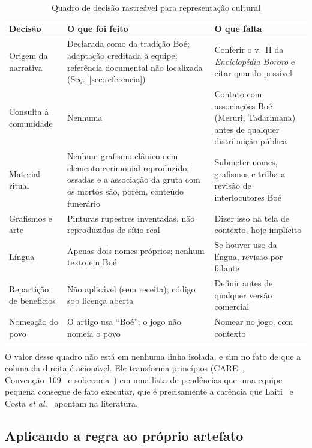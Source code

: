\documentclass[conference]{IEEEtran}
\begin{document}
\begin{table}[t]
\caption{Quadro de decisão rastreável para representação cultural}
\label{tab:protocolo}
\centering
\footnotesize
\begin{tabular}{p{1.9cm}p{2.6cm}p{2.8cm}}
\toprule
\textbf{Decisão} & \textbf{O que foi feito} & \textbf{O que falta} \\
\midrule
Origem da narrativa
& Declarada como da tradição Boé; adaptação creditada à equipe; referência documental não localizada (Seç.~\ref{sec:referencia})
& Conferir o v.~II da \textit{Enciclopédia Bororo} e citar quando possível \\[3pt]
Consulta à comunidade
& Nenhuma
& Contato com associações Boé (Meruri, Tadarimana) antes de qualquer distribuição pública \\[3pt]
Material ritual
& Nenhum grafismo clânico nem elemento cerimonial reproduzido; ossadas e a associação da gruta com os mortos são, porém, conteúdo funerário
& Submeter nomes, grafismos e trilha a revisão de interlocutores Boé \\[3pt]
Grafismos e arte
& Pinturas rupestres inventadas, não reproduzidas de sítio real
& Dizer isso na tela de contexto, hoje implícito \\[3pt]
Língua
& Apenas dois nomes próprios; nenhum texto em Boé
& Se houver uso da língua, revisão por falante \\[3pt]
Repartição de benefícios
& Não aplicável (sem receita); código sob licença aberta
& Definir antes de qualquer versão comercial \\[3pt]
Nomeação do povo
& O artigo usa ``Boé''; o jogo não nomeia o povo
& Nomear no jogo, com contexto \\
\bottomrule
\end{tabular}
\end{table}

O valor desse quadro não está em nenhuma linha isolada, e sim no fato de que a coluna da
direita é acionável. Ele transforma princípios (CARE~\cite{carroll2020},
Convenção~169~\cite{oit1989} e soberania~\cite{lapensee2022}) em uma lista de pendências
que uma equipe pequena consegue de fato executar, que é precisamente a carência que
Laiti~\cite{laiti2025} e Costa \textit{et al.}~\cite{costa2025} apontam na literatura.

\subsection{Aplicando a regra ao próprio artefato}
\label{sec:autoaplicacao}
\end{document}

